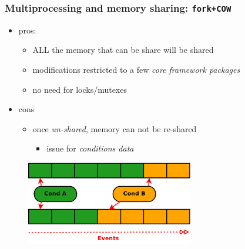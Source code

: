 \documentclass[9pt]{beamer}
\newcommand{\mypurple}[1]{{\color[rgb]{0.7,0,0.8}#1}}
\newcommand{\mygreen}[1] {{\color[rgb]{0,0.5,0}#1}}
\begin{document}
\begin{frame}
\frametitle{Multiprocessing and memory sharing: \texttt{fork+COW}}
\begin{block}{}
\begin{itemize}
  \item pros:
    \begin{itemize}
      \item \mypurple{ALL} the memory that can be share \mypurple{will be shared}
      \item modifications restricted to a few \emph{core framework packages}
      \item no need for \mygreen{locks/mutexes}
    \end{itemize}
\end{itemize}
\end{block}

\begin{exampleblock}{}
  \begin{itemize}
    \item cons
      \begin{itemize}
        \item once \emph{un-shared}, memory can not be \mypurple{re-shared}
          \begin{itemize}
            \item issue for \emph{conditions data}
          \end{itemize}
      \end{itemize}
  \end{itemize}
\end{exampleblock}

\begin{figure}
  \begin{center}
    \includegraphics[angle=0,width=0.65\textwidth]{figs/cond-data-flow.pdf}
  \end{center}
\end{figure}
\end{frame}
\end{document}
